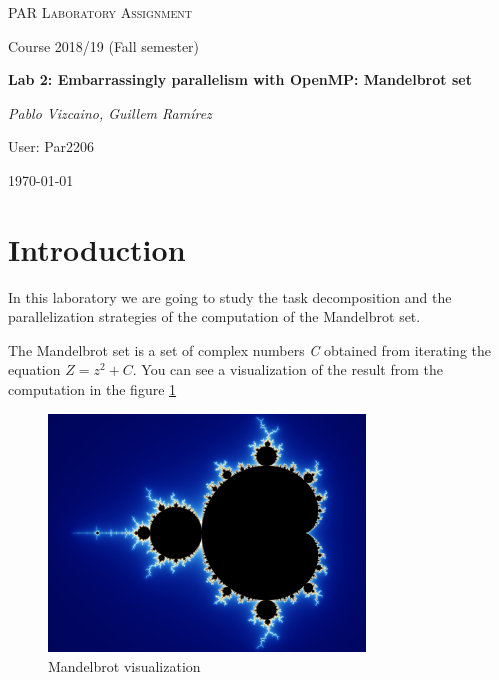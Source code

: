 \documentclass{article}
\begin{document}
\begin{titlepage}
	\centering
	\vspace{1cm}
	{\scshape\Large PAR Laboratory Assignment\par}
	\vspace{0.75cm}
	{\Large Course 2018/19 (Fall semester)\par}
	\vspace{0.75cm}
	{\huge\bfseries Lab 2:  Embarrassingly parallelism with OpenMP: Mandelbrot set\par}
	\vspace{1cm}
	{\Large\itshape Pablo Vizcaino, Guillem Ramírez\par}
    \vspace{0.5cm}
    {\Large User: Par2206\par}
    \vfill
	{\large \today\par}
\end{titlepage}

 
\clearpage
\tableofcontents
\clearpage 

\section{Introduction}
\begin{flushleft}
In this laboratory we are going to study the task decomposition and the parallelization strategies of the computation of the Mandelbrot set.
\end{flushleft}

\begin{flushleft}
The Mandelbrot set is a set of complex numbers \textit{C} obtained from iterating the equation $Z = z^2 + C$.
You can see a visualization of the result from the computation in the figure \ref{fig:mandelbrot1}
\end{flushleft}

\begin{figure}[ht]
    \centering
    \includegraphics[width=0.75\textwidth]{mandelbrot.jpg}
    \caption{Mandelbrot visualization}
    \label{fig:mandelbrot1}
\end{figure}
\newpage
\end{document}
